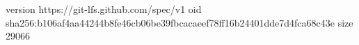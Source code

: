 version https://git-lfs.github.com/spec/v1
oid sha256:b106af4aa44244b8fe46cb06be39fbcacaeef78ff16b24401dde7d4fca68c43e
size 29066
